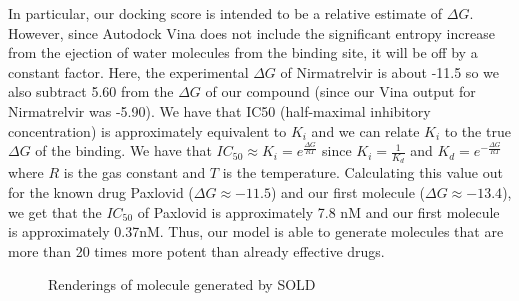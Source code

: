 \documentclass[11pt]{article}
\begin{document}
In particular, our docking score is intended to be a relative estimate of $\Delta G$. 
However, since Autodock Vina does not include the significant entropy increase from 
the ejection of water molecules from the binding site, it will be off by a constant factor. 
Here, the experimental $\Delta G$ of Nirmatrelvir is about -11.5 \cite{biom13091339} 
so we also subtract 5.60 from the 
$\Delta G$ of our compound (since our Vina output for Nirmatrelvir was -5.90).
We have that IC50 (half-maximal inhibitory concentration) is approximately equivalent to 
$K_i$ and we can relate $K_i$ to the 
true $\Delta G$ of the binding. We have that $IC_{50} \approx K_i = e^{\frac{\Delta G}{RT}}$ 
since $K_i = \frac{1}{K_d}$ and $K_d = e^{-\frac{\Delta G}{RT}}$
where $R$ is the gas constant and $T$ is the temperature. Calculating this value out 
for the known drug Paxlovid ($\Delta G \approx -11.5$) and our first molecule ($\Delta G \approx -13.4$), we get that the 
$IC_{50}$ of Paxlovid is approximately 7.8 nM and our first molecule 
is approximately 0.37nM. Thus, our model is able to generate molecules that are 
more than 20 times more potent than already effective drugs. 

\begin{figure}[H]
    \centering
    \caption{Renderings of molecule generated by SOLD}
    \label{fig:mainb}
\end{figure}
\end{document}
